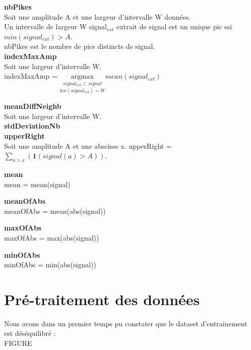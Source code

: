 \documentclass{article}
\begin{document}
\textbf{nbPikes} \\
Soit une amplitude A et une largeur d'intervalle W données.\\
Un intervalle de largeur W signal$_{ext}$ extrait de signal est un unique pic ssi $min(signal_{ext})>A$.  \\
nbPikes est le nombre de pics distincts de signal. \\

\textbf{indexMaxAmp} \\
Soit une largeur d'intervalle W. \\
indexMaxAmp = $\underset{len(signal_{ext})=W}{\underset{signal_{ext}\subset signal}{\text{argmax}}} mean(signal_{ext})$

\textbf{meanDiffNeighb} \\
Soit une largeur d'intervalle W. \\


\textbf{stdDeviationNb} \\

\textbf{upperRight} \\
Soit une amplitude A et une abscisse x. upperRight = $\sum\limits_{a>x}(\mathbf{1}(signal(a)>A))$.

\textbf{mean} \\
mean = mean(signal)

\textbf{meanOfAbs} \\
meanOfAbs = mean(abs(signal))

\textbf{maxOfAbs} \\
maxOfAbs = max(abs(signal))

\textbf{minOfAbs} \\
minOfAbs = min(abs(signal))

\section{Pré-traitement des données}

Nous avons dans un premier temps pu constater que le dataset d'entrainement est déséquilibré :
\\

FIGURE
\\
\end{document}
